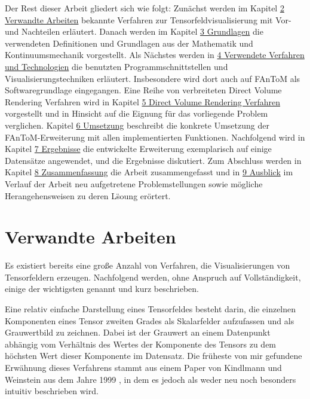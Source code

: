 \documentclass[a4paper,fontsize=12pt,toc=bib,parskip=half,ngerman]{scrartcl}
\begin{document}
Der Rest dieser Arbeit gliedert sich wie folgt: Zun\"achst werden im Kapitel \hyperref[sec:Verwandte]{2 Verwandte Arbeiten} bekannte Verfahren zur Tensorfeldvisualisierung mit Vor- und Nachteilen erl\"autert. Danach werden im Kapitel \hyperref[sec:Grundlagen]{3 Grundlagen} die verwendeten Definitionen und Grundlagen aus der Mathematik und Kontinuumsmechanik vorgestellt. Als N\"achstes werden in \hyperref[sec:Technologien]{4 Verwendete Verfahren und Technologien} die benutzten Programmschnittstellen und Visualisierungstechniken erl\"autert. Insbesondere wird dort auch auf FAnToM als Softwaregrundlage eingegangen. Eine Reihe von verbreiteten Direct Volume Rendering Verfahren wird in Kapitel \hyperref[sec:DVR]{5 Direct Volume Rendering Verfahren} vorgestellt und in Hinsicht auf die Eignung f\"ur das vorliegende Problem verglichen. Kapitel \hyperref[sec:Umsetzung]{6 Umsetzung} beschreibt die konkrete Umsetzung der FAnToM-Erweiterung mit allen implementierten Funktionen. Nachfolgend wird in Kapitel \hyperref[sec:Ergebnisse]{7 Ergebnisse} die entwickelte Erweiterung exemplarisch auf einige Datens\"atze angewendet, und die Ergebnisse diskutiert. Zum Abschluss werden in Kapitel \hyperref[sec:Zusammenfassung]{8 Zusammenfassung} die Arbeit zusammengefasst und in  \hyperref[sec:Ausblick]{9 Ausblick} im Verlauf der Arbeit neu aufgetretene Problemstellungen sowie m\"ogliche Herangehensweisen zu deren L\"soung er\"ortert.
 
\section{Verwandte Arbeiten}
\label{sec:Verwandte}
Es existiert bereits eine gro{\ss}e Anzahl von Verfahren, die Visualisierungen von Tensorfeldern erzeugen. Nachfolgend werden, ohne Anspruch auf Vollst\"andigkeit, einige der wichtigsten genannt und kurz beschrieben.

Eine relativ einfache Darstellung eines Tensorfeldes besteht darin, die einzelnen Komponenten eines Tensor zweiten Grades als Skalarfelder aufzufassen und als Grauwertbild zu zeichnen. Dabei ist der Grauwert an einem Datenpunkt abh\"angig vom Verh\"altnis des Wertes der Komponente des Tensors zu dem h\"ochsten Wert dieser Komponente im Datensatz. Die fr\"uheste von mir gefundene Erw\"ahnung dieses Verfahrens stammt aus einem Paper von Kindlmann und Weinstein aus dem Jahre 1999 \cite{kindlmann1999hue}, in dem es jedoch als weder neu noch besonders intuitiv beschrieben wird. 
\end{document}
